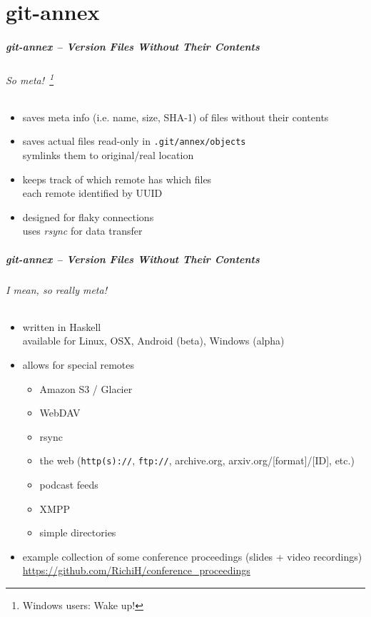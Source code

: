 \documentclass[english,hyperref={pdfpagelabels=false},aspectratio=169]{beamer}
\begin{document}
\part{git-annex}
\makepart

\begin{frame}[label=gitannex]
  \frametitle{git-annex -- Version Files Without Their Contents}
  \framesubtitle{So meta!~\footnote{\tiny Windows users: Wake up!}}
  \begin{itemize}
    \item saves meta info {\scriptsize\color{fzjgray50}(i.e. name, size, SHA-1)} of files without their contents
    \item saves actual files read-only in \texttt{.git/annex/objects}\\
      {\scriptsize symlinks them to original/real location}
    \item keeps track of which remote has which files\\
      {\scriptsize each remote identified by UUID}
    \item designed for flaky connections\\
      {\scriptsize uses \emph{rsync} for data transfer}
  \end{itemize}
\end{frame}

\begin{frame}
  \frametitle{git-annex -- Version Files Without Their Contents}
  \framesubtitle{I mean, so really meta!}
  \begin{itemize}
    \item written in Haskell\\
      {\scriptsize available for Linux, OSX, Android (beta), Windows (alpha)}
    \item allows for special remotes
      \begin{itemize}
        \item Amazon S3 / Glacier
        \item WebDAV
        \item rsync
        \item the web {\scriptsize\color{fzjgray50}(\texttt{http(s)://}, \texttt{ftp://}, archive.org, arxiv.org/[format]/[ID], etc.)}
        \item podcast feeds
        \item XMPP
        \item simple directories
      \end{itemize}
    \item example collection of some conference proceedings {\scriptsize\color{fzjgray50}(slides + video recordings)}\\
      {\scriptsize \url{https://github.com/RichiH/conference_proceedings}}
  \end{itemize}
\end{frame}
\end{document}
